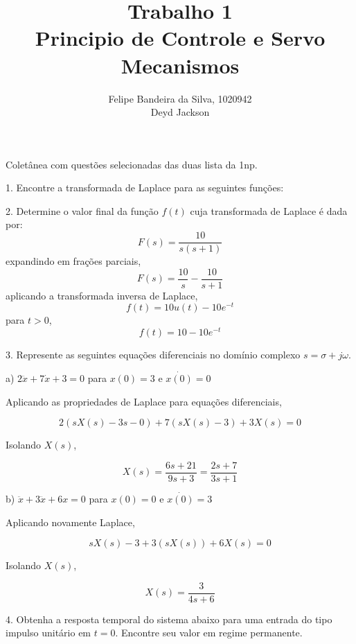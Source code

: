 \documentclass[paper=a4, fontsize=11pt]{article}
\title{Trabalho 1\\Principio de Controle e Servo Mecanismos}
\author{Felipe Bandeira da Silva, 1020942\\Deyd Jackson}
\begin{document}
\maketitle

Coletânea com questões selecionadas das duas lista da 1np.



\newpage

1. Encontre a transformada de Laplace para as seguintes funções:

\newpage

2. Determine o valor final da função $f(t)$ cuja transformada de Laplace é dada por:
$$
F(s) = \frac{10}{s(s+1)}
$$
expandindo em frações parciais,
$$
F(s) = \frac{10}{s} - \frac{10}{s+1}
$$
aplicando a transformada inversa de Laplace,
$$
f(t) = 10 u(t) - 10 e^{-t}
$$
para $t>0$,
$$
f(t) = 10 - 10 e^{-t}
$$

\newpage

3. Represente as seguintes equações diferenciais no domínio complexo $s=\sigma + j \omega$.

a) $2 \ddot{x} + 7 \dot{x} +  3 = 0$ para $x(0)=3$ e $\dot{x(0)}=0$

Aplicando as propriedades de Laplace para equações diferenciais,

$$
2 (s X(s) - 3 s - 0) + 7 (s X(s) - 3) + 3 X(s) = 0
$$

Isolando $X(s)$,

$$
X(s) = \frac{6s + 21}{9 s + 3} = \frac{2 s + 7}{3 s + 1}
$$

b) $\ddot{x} + 3 \ddot{x} + 6 x = 0$ para $x(0) = 0$ e $\dot{x(0)}=3$

Aplicando novamente Laplace,

$$
s X(s) - 3 + 3 (s X(s)) + 6 X(s) = 0
$$

Isolando $X(s)$,

$$
X(s) = \frac{3}{4 s + 6}
$$

\newpage

4. Obtenha a resposta temporal do sistema abaixo para uma entrada do tipo impulso unitário
em $t=0$. Encontre seu valor em regime permanente.
\end{document}
